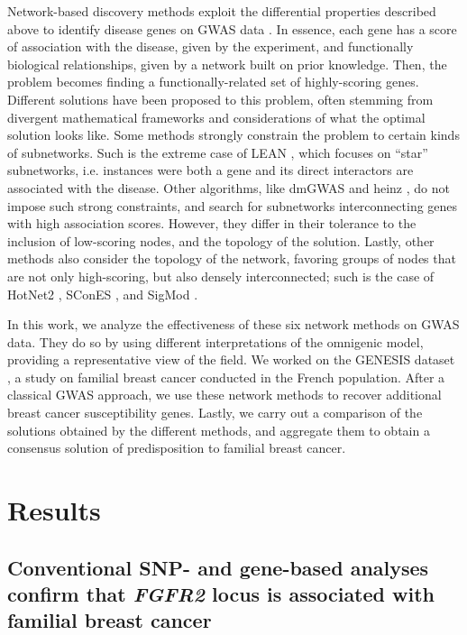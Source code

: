 \documentclass[10pt,letterpaper]{article}
\begin{document}
Network-based discovery methods exploit the differential properties described above to identify disease genes on GWAS data \cite{azencott_network-guided_2016}. In essence, each gene has a score of association with the disease, given by the experiment, and functionally biological relationships, given by a network built on prior knowledge. Then, the problem becomes finding a functionally-related set of highly-scoring genes. Different solutions have been proposed to this problem, often stemming from divergent mathematical frameworks and considerations of what the optimal solution looks like. Some methods strongly constrain the problem to certain kinds of subnetworks. Such is the extreme case of LEAN \cite{gwinner_network-based_2016}, which focuses on ``star'' subnetworks, i.e. instances were both a gene and its direct interactors are associated with the disease. Other algorithms, like dmGWAS \cite{jia_dmgwas:_2011} and heinz \cite{dittrich_identifying_2008}, do not impose such strong constraints, and search for subnetworks interconnecting genes with high association scores. However, they differ in their tolerance to the inclusion of low-scoring nodes, and the topology of the solution. Lastly, other methods also consider the topology of the network, favoring groups of nodes that are not only high-scoring, but also densely interconnected; such is the case of HotNet2 \cite{leiserson_pan-cancer_2015}, SConES \cite{azencott_efficient_2013}, and SigMod \cite{liu_sigmod:_2017}.

In this work, we analyze the effectiveness of these six network methods on GWAS data. They do so by using different interpretations of the omnigenic model, providing a representative view of the field. We worked on the GENESIS dataset \cite{sinilnikova_genesis:_2016}, a study on familial breast cancer conducted in the French population. After a classical GWAS approach, we use these network methods to recover additional breast cancer susceptibility genes. Lastly, we carry out a comparison of the solutions obtained by the different methods, and aggregate them to obtain a consensus solution of predisposition to familial breast cancer. 

\section{Results}

\subsection{Conventional SNP- and gene-based analyses confirm that \emph{FGFR2} locus is associated with familial breast cancer}
\label{results:conventional}
\end{document}
